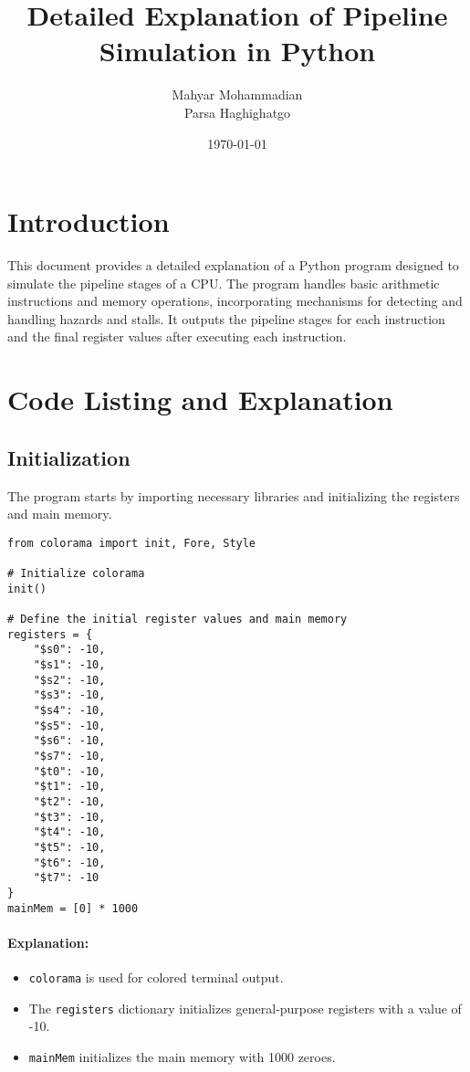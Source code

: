 \documentclass{article}
\title{Detailed Explanation of Pipeline Simulation in Python}
\author{Mahyar Mohammadian \\ Parsa Haghighatgo}
\date{\today}
\begin{document}
\maketitle

\section{Introduction}
This document provides a detailed explanation of a Python program designed to simulate the pipeline stages of a CPU. The program handles basic arithmetic instructions and memory operations, incorporating mechanisms for detecting and handling hazards and stalls. It outputs the pipeline stages for each instruction and the final register values after executing each instruction.

\section{Code Listing and Explanation}


\subsection{Initialization}
The program starts by importing necessary libraries and initializing the registers and main memory.

\begin{lstlisting}[caption={Initialization}]
from colorama import init, Fore, Style

# Initialize colorama
init()

# Define the initial register values and main memory
registers = {
    "$s0": -10,
    "$s1": -10,
    "$s2": -10,
    "$s3": -10,
    "$s4": -10,
    "$s5": -10,
    "$s6": -10,
    "$s7": -10,
    "$t0": -10,
    "$t1": -10,
    "$t2": -10,
    "$t3": -10,
    "$t4": -10,
    "$t5": -10,
    "$t6": -10,
    "$t7": -10
}
mainMem = [0] * 1000
\end{lstlisting}

\paragraph{Explanation:}
\begin{itemize}
    \item \texttt{colorama} is used for colored terminal output.
    \item The \texttt{registers} dictionary initializes general-purpose registers with a value of -10.
    \item \texttt{mainMem} initializes the main memory with 1000 zeroes.
\end{itemize}
\end{document}
